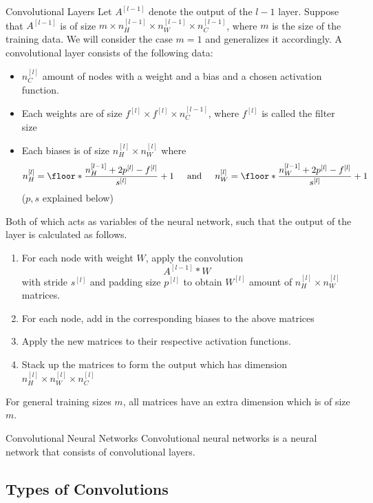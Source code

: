 \documentclass[a4paper]{article}
\begin{document}
\begin{enumerate}
\begin{defn}{Convolutional Layers}{} Let $A^{[l-1]}$ denote the output of the $l-1$ layer. Suppose that $A^{[l-1]}$ is of size $m\times n_H^{[l-1]}\times n_W^{[l-1]}\times n_C^{[l-1]}$, where $m$ is the size of the training data. We will consider the case $m=1$ and generalizes it accordingly. A convolutional layer consists of the following data: 
\begin{itemize}
\item $n_C^{[l]}$ amount of nodes with a weight and a bias and a chosen activation function. 
\item Each weights are of size $f^{[l]}\times f^{[l]}\times n_C^{[l-1]}$, where $f^{[l]}$ is called the filter size
\item Each biases is of size $n_H^{[l]}\times n_W^{[l]}$ where $$n_H^{[l]}=\floor*{\frac{n_H^{[l-1]}+2p^{[l]}-f^{[l]}}{s^{[l]}}}+1\;\;\;\;\text{ and }\;\;\;\; n_W^{[l]}=\floor*{\frac{n_W^{[l-1]}+2p^{[l]}-f^{[l]}}{s^{[l]}}}+1$$ ($p,s$ explained below)
\end{itemize}
Both of which acts as variables of the neural network, such that the output of the layer is calculated as follows. 
\begin{enumerate}
\item For each node with weight $W$, apply the convolution $$A^{[l-1]}\ast W$$ with stride $s^{[l]}$ and padding size $p^{[l]}$ to obtain $W^{[l]}$ amount of $n_H^{[l]}\times n_W^{[l]}$ matrices. 
\item For each node, add in the corresponding biases to the above matrices
\item Apply the new matrices to their respective activation functions. 
\item Stack up the matrices to form the output which has dimension $n_H^{[l]}\times n_W^{[l]}\times n_C^{[l]}$
\end{enumerate}
For general training sizes $m$, all matrices have an extra dimension which is of size $m$. 
\end{defn}

\begin{defn}{Convolutional Neural Networks}{} Convolutional neural networks is a neural network that consists of convolutional layers. 
\end{defn}

\subsection{Types of Convolutions}


\end{enumerate}
\end{document}
